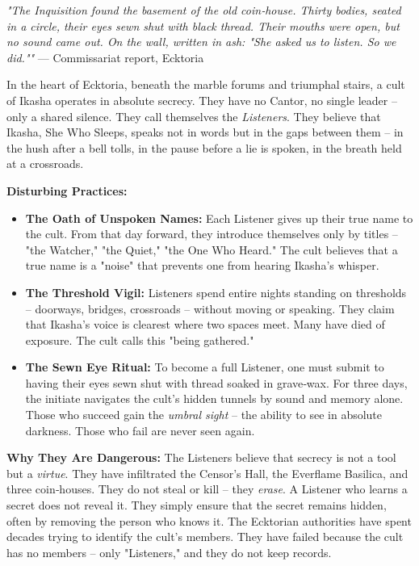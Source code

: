 \documentclass[10pt,a5paper]{book}
\begin{document}
\textit{"The Inquisition found the basement of the old coin‑house. Thirty bodies, seated in a circle, their eyes sewn shut with black thread. Their mouths were open, but no sound came out. On the wall, written in ash: "She asked us to listen. So we did.""} --- Commissariat report, Ecktoria

In the heart of Ecktoria, beneath the marble forums and triumphal stairs, a cult of Ikasha operates in absolute secrecy. They have no Cantor, no single leader -- only a shared silence. They call themselves the \textit{Listeners}. They believe that Ikasha, She Who Sleeps, speaks not in words but in the gaps between them -- in the hush after a bell tolls, in the pause before a lie is spoken, in the breath held at a crossroads.

\textbf{Disturbing Practices:}
\begin{itemize}
    \item \textbf{The Oath of Unspoken Names:} Each Listener gives up their true name to the cult. From that day forward, they introduce themselves only by titles -- "the Watcher," "the Quiet," "the One Who Heard." The cult believes that a true name is a "noise" that prevents one from hearing Ikasha's whisper.
    \item \textbf{The Threshold Vigil:} Listeners spend entire nights standing on thresholds -- doorways, bridges, crossroads -- without moving or speaking. They claim that Ikasha's voice is clearest where two spaces meet. Many have died of exposure. The cult calls this "being gathered."
    \item \textbf{The Sewn Eye Ritual:} To become a full Listener, one must submit to having their eyes sewn shut with thread soaked in grave‑wax. For three days, the initiate navigates the cult's hidden tunnels by sound and memory alone. Those who succeed gain the \textit{umbral sight} -- the ability to see in absolute darkness. Those who fail are never seen again.
\end{itemize}

\textbf{Why They Are Dangerous:} The Listeners believe that secrecy is not a tool but a \textit{virtue}. They have infiltrated the Censor's Hall, the Everflame Basilica, and three coin‑houses. They do not steal or kill -- they \textit{erase}. A Listener who learns a secret does not reveal it. They simply ensure that the secret remains hidden, often by removing the person who knows it. The Ecktorian authorities have spent decades trying to identify the cult's members. They have failed because the cult has no members -- only "Listeners," and they do not keep records.
\end{document}
